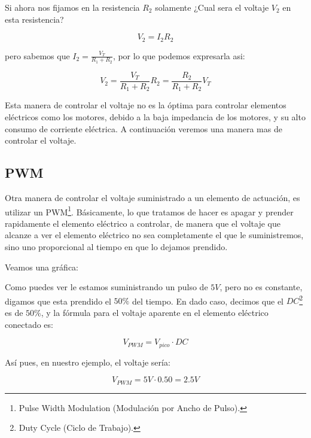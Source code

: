 		Si ahora nos fijamos en la resistencia $R_2$ solamente ¿Cual sera el voltaje $V_2$ en esta resistencia?

		\begin{equation}
			V_2 = I_2 R_2
		\end{equation}

		pero sabemos que $I_2 = \frac{V_T}{R_1 + R_2}$, por lo que podemos expresarla asi:

		\begin{equation}
			V_2 = \frac{V_T}{R_1 + R_2} R_2 = \frac{R_2}{R_1 + R_2} V_T 
		\end{equation}

		Esta manera de controlar el voltaje no es la óptima para controlar elementos eléctricos como los motores, debido a la baja impedancia de los motores, y su alto consumo de corriente eléctrica. A continuación veremos una manera mas de controlar el voltaje.


	\subsection{PWM}

		Otra manera de controlar el voltaje suministrado a un elemento de actuación, es utilizar un PWM\footnote{Pulse Width Modulation (Modulación por Ancho de Pulso).}. Básicamente, lo que tratamos de hacer es apagar y prender rapidamente el elemento eléctrico a controlar, de manera que el voltaje que alcanze a ver el elemento eléctrico no sea completamente el que le suministremos, sino uno proporcional al tiempo en que lo dejamos prendido.

		Veamos una gráfica:



		Como puedes ver le estamos suministrando un pulso de $5 V$, pero no es constante, digamos que esta prendido el $50\%$ del tiempo. En dado caso, decimos que el $DC$\footnote{Duty Cycle (Ciclo de Trabajo).} es de $50\%$, y la fórmula para el voltaje aparente en el elemento eléctrico conectado es:

		\begin{equation}
			V_{PWM} = V_{pico} \cdot DC
		\end{equation}

		Así pues, en nuestro ejemplo, el voltaje sería:

		\begin{equation}
			V_{PWM} = 5 V \cdot 0.50 = 2.5 V
		\end{equation}

